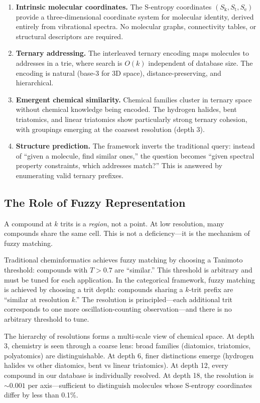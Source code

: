 \documentclass[11pt,a4paper]{article}
\theoremstyle{definition}
\theoremstyle{remark}
\newcommand{\Sk}{S_{\mathrm{k}}}
\newcommand{\St}{S_{\mathrm{t}}}
\newcommand{\Se}{S_{\mathrm{e}}}
\begin{document}
\begin{enumerate}
\item \textbf{Intrinsic molecular coordinates.} The S-entropy coordinates $(\Sk, \St, \Se)$ provide a three-dimensional coordinate system for molecular identity, derived entirely from vibrational spectra. No molecular graphs, connectivity tables, or structural descriptors are required.

\item \textbf{Ternary addressing.} The interleaved ternary encoding maps molecules to addresses in a trie, where search is $O(k)$ independent of database size. The encoding is natural (base-3 for 3D space), distance-preserving, and hierarchical.

\item \textbf{Emergent chemical similarity.} Chemical families cluster in ternary space without chemical knowledge being encoded. The hydrogen halides, bent triatomics, and linear triatomics show particularly strong ternary cohesion, with groupings emerging at the coarsest resolution (depth 3).

\item \textbf{Structure prediction.} The framework inverts the traditional query: instead of ``given a molecule, find similar ones,'' the question becomes ``given spectral property constraints, which addresses match?'' This is answered by enumerating valid ternary prefixes.
\end{enumerate}

\subsection{The Role of Fuzzy Representation}

A compound at $k$ trits is a \emph{region}, not a point. At low resolution, many compounds share the same cell. This is not a deficiency---it is the mechanism of fuzzy matching.

Traditional cheminformatics achieves fuzzy matching by choosing a Tanimoto threshold: compounds with $T > 0.7$ are ``similar.'' This threshold is arbitrary and must be tuned for each application. In the categorical framework, fuzzy matching is achieved by choosing a trit depth: compounds sharing a $k$-trit prefix are ``similar at resolution $k$.'' The resolution is principled---each additional trit corresponds to one more oscillation-counting observation---and there is no arbitrary threshold to tune.

The hierarchy of resolutions forms a multi-scale view of chemical space. At depth 3, chemistry is seen through a coarse lens: broad families (diatomics, triatomics, polyatomics) are distinguishable. At depth 6, finer distinctions emerge (hydrogen halides vs other diatomics, bent vs linear triatomics). At depth 12, every compound in our database is individually resolved. At depth 18, the resolution is $\sim 0.001$ per axis---sufficient to distinguish molecules whose S-entropy coordinates differ by less than 0.1\%.
\end{document}
